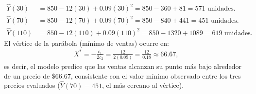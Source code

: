 \begin{solproblema}[prob:bc664de]
	\begin{align}
		\hat Y(30) &= 850-12(30)+0.09(30)^2 = 850-360+81 = 571 \text{ unidades.} \\
		\hat Y(70) &= 850-12(70)+0.09(70)^2 = 850-840+441 = 451 \text{ unidades.} \\
		\hat Y(110) &= 850-12(110)+0.09(110)^2 = 850-1320+1089 = 619 \text{ unidades.}
	\end{align}
	El vértice de la parábola (mínimo de ventas) ocurre en:
	\begin{align}
		X^* = -\frac{c_1}{2c_2} = \frac{12}{2(0.09)} = \frac{12}{0.18} \approx 66.67,
	\end{align}
	es decir, el modelo predice que las ventas alcanzan su punto más bajo alrededor de un precio de $\$66.67$, consistente con el valor mínimo observado entre los tres precios evaluados ($\hat Y(70)=451$, el más cercano al vértice).
\end{solproblema}
